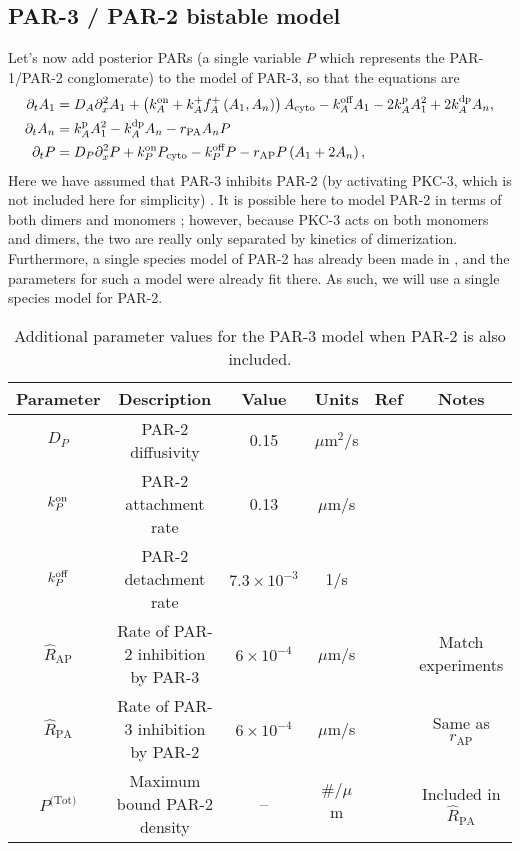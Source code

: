 \documentclass[11pt]{article}
\newcommand{\6}[1]{#1_{\text{6}}}
\newcommand{\3}[1]{#1_{\text{3}}}
\newcommand{\Tot}[1]{#1^\text{(Tot)}}
\newcommand{\A}[1]{#1_A}
\begin{document}
\subsection{PAR-3 / PAR-2 bistable model \label{sec:P2P3}}
Let's now add posterior PARs (a single variable $P$ which represents the PAR-1/PAR-2 conglomerate) to the model of PAR-3, so that the equations are 
\begin{subequations}
\label{eq:P32}
\begin{align}
\Dt A_1 &= D_A \Dx^2 A_1 +\left( \kon_A +\A{\kf}\A{f}^+\left(\MA,\PA\right)\right) A_\text{cyto} - \koff_A \MA -2\kp_A \MA^2+2\kdp_A \PA,\\
\Dt \PA &= \kp_A \MA^2 - \kdp_A \PA-r_\text{PA} \PA P\\
\Dt P &= D_P \Dx^2 P + \kon_P P_\text{cyto} - \koff_P P -r_\text{AP} P\left(\MA+2\PA\right),%
\end{align}
\end{subequations}
Here we have assumed that PAR-3 inhibits PAR-2 (by activating PKC-3, which is not included here for simplicity) \cite{lang2017proteins}. It is possible here to model PAR-2 in terms of both dimers and monomers \cite{bland2023optimized}; however, because PKC-3 acts on both monomers and dimers, the two are really only separated by kinetics of dimerization. Furthermore, a single species model of PAR-2 has already been made in \cite{gross2019guiding}, and the parameters for such a model were already fit there. As such, we will use a single species model for PAR-2. 

\begin{table}
\begin{small}
\centering
\begin{tabular}{|c|c|c|c|c|c|}\hline
Parameter & Description & Value & Units & Ref & Notes \\ \hline
$D_P$ & PAR-2 diffusivity & 0.15 & $\mu$m$^2$/s & \cite{goehring2011polarization}&  \\ 
$k^\text{on}_P$ & PAR-2 attachment rate & 0.13 & $\mu$m/s &\cite{gross2019guiding} & \\ 
$k^\text{off}_P$ & PAR-2 detachment rate & $7.3 \times 10^{-3}$ & 1/s & \cite{goehring2011polarization}&  \\  
$\hat{R}_\text{AP}$ & Rate of PAR-2 inhibition by PAR-3 & $6 \times 10^{-4}$ & $\mu$m/s & & Match experiments \cite[Fig.~5B]{zonies2010symmetry}\\
$\hat{R}_\text{PA}$ & Rate of PAR-3 inhibition by PAR-2 &$6 \times 10^{-4}$  & $\mu$m/s & \ & Same as $r_\text{AP}$\\
$\Tot{P}$ & Maximum bound PAR-2 density & -- & $\#/\mu$m& &  Included in $\hat{R}_\text{PA}$ \\ \hline
\end{tabular}
\caption{\label{tab:paramsP2}Additional parameter values for the PAR-3 model when PAR-2  is also included.}
\end{small}
\end{table}
\end{document}
